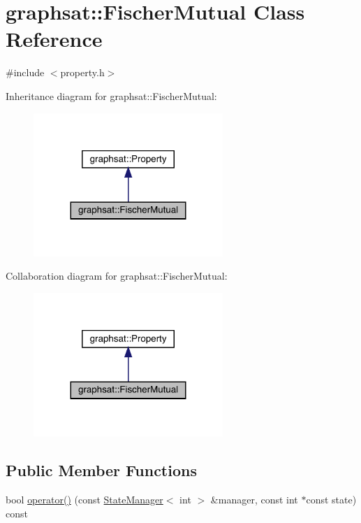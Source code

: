 \hypertarget{classgraphsat_1_1_fischer_mutual}{}\section{graphsat\+::Fischer\+Mutual Class Reference}
\label{classgraphsat_1_1_fischer_mutual}


{\ttfamily \#include $<$property.\+h$>$}



Inheritance diagram for graphsat\+::Fischer\+Mutual\+:\nopagebreak
\begin{figure}[H]
\begin{center}
\leavevmode
\includegraphics[width=203pt]{classgraphsat_1_1_fischer_mutual__inherit__graph}
\end{center}
\end{figure}


Collaboration diagram for graphsat\+::Fischer\+Mutual\+:\nopagebreak
\begin{figure}[H]
\begin{center}
\leavevmode
\includegraphics[width=203pt]{classgraphsat_1_1_fischer_mutual__coll__graph}
\end{center}
\end{figure}
\subsection*{Public Member Functions}
\begin{DoxyCompactItemize}
\item 
bool \mbox{\hyperlink{classgraphsat_1_1_fischer_mutual_a11572dd4ab57bd628b3424f5aa2b9b47}{operator()}} (const \mbox{\hyperlink{classgraphsat_1_1_state_manager}{State\+Manager}}$<$ int $>$ \&manager, const int $\ast$const state) const
\end{DoxyCompactItemize}


